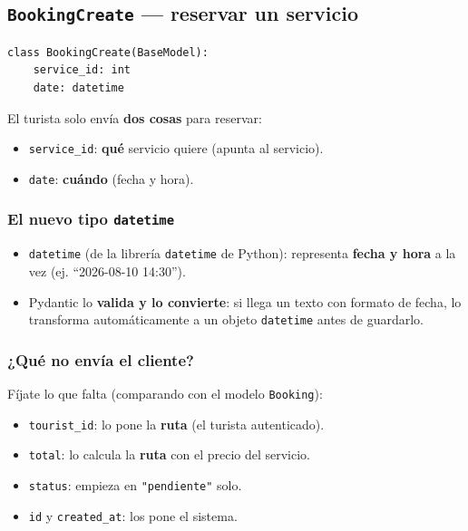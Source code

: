 \documentclass[11pt,a4paper]{article}
\begin{document}
\subsection{\texttt{BookingCreate} --- reservar un servicio}

\begin{lstlisting}
class BookingCreate(BaseModel):
    service_id: int
    date: datetime
\end{lstlisting}

El turista solo envía \textbf{dos cosas} para reservar:
\begin{itemize}
    \item \texttt{service\_id}: \textbf{qué} servicio quiere (apunta al servicio).
    \item \texttt{date}: \textbf{cuándo} (fecha y hora).
\end{itemize}

\subsubsection{El nuevo tipo \texttt{datetime}}

\begin{itemize}
    \item \texttt{datetime} (de la librería \texttt{datetime} de Python): representa
    \textbf{fecha y hora} a la vez (ej. ``2026-08-10 14:30'').
    \item Pydantic lo \textbf{valida y lo convierte}: si llega un texto con formato de fecha,
    lo transforma automáticamente a un objeto \texttt{datetime} antes de guardarlo.
\end{itemize}

\subsubsection{¿Qué \textbf{no} envía el cliente?}

Fíjate lo que falta (comparando con el modelo \texttt{Booking}):
\begin{itemize}
    \item \texttt{tourist\_id}: lo pone la \textbf{ruta} (el turista autenticado).
    \item \texttt{total}: lo calcula la \textbf{ruta} con el precio del servicio.
    \item \texttt{status}: empieza en \texttt{"pendiente"} solo.
    \item \texttt{id} y \texttt{created\_at}: los pone el sistema.
\end{itemize}
\end{document}

